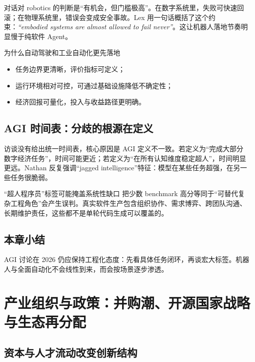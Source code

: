 \documentclass[a4paper]{article}
\begin{document}
对话对 robotics 的判断是“有机会，但门槛极高”。在数字系统里，失败可快速回滚；在物理系统里，错误会变成安全事故。Lex 用一句话概括了这个约束：\textit{``embodied systems are almost allowed to fail never''}。这让机器人落地节奏明显慢于纯软件 Agent。

\begin{importantbox}{为什么自动驾驶和工业自动化更先落地}
\begin{itemize}[leftmargin=1.5em]
    \item 任务边界更清晰，评价指标可定义；
    \item 运行环境相对可控，可通过基础设施降低不确定性；
    \item 经济回报可量化，投入与收益路径更明确。
\end{itemize}
\end{importantbox}

\subsection{AGI 时间表：分歧的根源在定义}

访谈没有给出统一时间表，核心原因是 AGI 定义不一致。若定义为“完成大部分数字经济任务”，时间可能更近；若定义为“在所有认知维度稳定超人”，时间明显更远。Nathan 反复强调“jagged intelligence”特征：模型在某些任务超强，在另一些任务很脆弱。

\begin{warningbox}{“超人程序员”标签可能掩盖系统性缺口}
把少数 benchmark 高分等同于“可替代复杂工程角色”会产生误判。真实软件生产包含组织协作、需求博弈、跨团队沟通、长期维护责任，这些都不是单轮代码生成可以覆盖的。
\end{warningbox}

\subsection{本章小结}

AGI 讨论在 2026 仍应保持工程化态度：先看具体任务闭环，再谈宏大标签。机器人与全面自动化不会线性到来，而会按场景逐步渗透。

\section{产业组织与政策：并购潮、开源国家战略与生态再分配}

\subsection{资本与人才流动改变创新结构}
\end{document}
